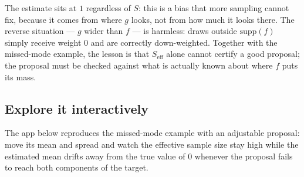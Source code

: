 \documentclass[
  letterpaper,
  DIV=11,
  numbers=noendperiod]{scrreprt}
\begin{document}
The estimate sits at \(1\) regardless of \(S\): this is a bias that more
sampling cannot fix, because it comes from where \(g\) looks, not from
how much it looks there. The reverse situation --- \(g\) wider than
\(f\) --- is harmless: draws outside \(\text{supp}(f)\) simply receive
weight \(0\) and are correctly down-weighted. Together with the
missed-mode example, the lesson is that \(S_{\text{eff}}\) alone cannot
certify a good proposal; the proposal must be checked against what is
actually known about where \(f\) puts its mass.

\subsection{Explore it interactively}\label{explore-it-interactively-2}

The app below reproduces the missed-mode example with an adjustable
proposal: move its mean and spread and watch the effective sample size
stay high while the estimated mean drifts away from the true value of
\(0\) whenever the proposal fails to reach both components of the
target.
\end{document}
